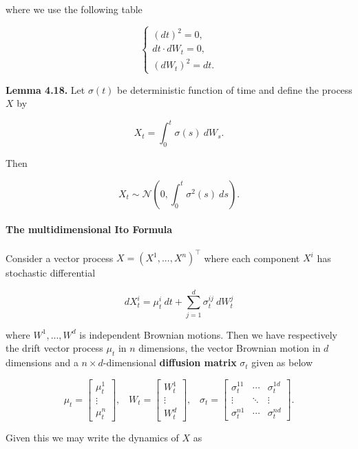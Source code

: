 \documentclass[
]{article}
\begin{document}
where we use the following table

\[
\left\{\begin{matrix}(dt)^2=0,\\ dt\cdot dW_t=0,\\ (dW_t)^2=dt.\end{matrix}\right.
\]

\textbf{Lemma 4.18.} Let \(\sigma(t)\) be deterministic function of time
and define the process \(X\) by

\[
X_t=\int_0^t \sigma(s)\ dW_s.\tag{4.37}
\]

Then

\[
X_t\sim\mathcal{N}\left(0,\int_0^t\sigma^2(s)\ ds\right).
\]

\hypertarget{the-multidimensional-ito-formula}{%
\paragraph{The multidimensional Ito
Formula}\label{the-multidimensional-ito-formula}}

Consider a vector process \(X=(X^1,...,X^n)^\top\) where each component
\(X^i\) has stochastic differential

\[
d X_t^i=\mu_t^i\ dt+\sum_{j=1}^d\sigma^{ij}_t\ dW_t^j
\]

where \(W^1,...,W^d\) is independent Brownian motions. Then we have
respectively the drift vector process \(\mu_t\) in \(n\) dimensions, the
vector Brownian motion in \(d\) dimensions and a
\(n\times d\)-dimensional \textbf{diffusion matrix} \(\sigma_t\) given
as below

\[
\mu_t=\begin{bmatrix}\mu^1_t\\ \vdots\\ \mu^n_t\end{bmatrix},\hspace{10pt}W_t=\begin{bmatrix}W^1_t\\ \vdots\\ W^d_t\end{bmatrix},\hspace{10pt}\sigma_t=\begin{bmatrix}\sigma^{11}_t & \cdots & \sigma^{1d}_t \\ \vdots & \ddots & \vdots\\ \sigma^{n1}_t &\cdots& \sigma^{nd}_t\end{bmatrix}.
\]

Given this we may write the dynamics of \(X\) as
\end{document}
